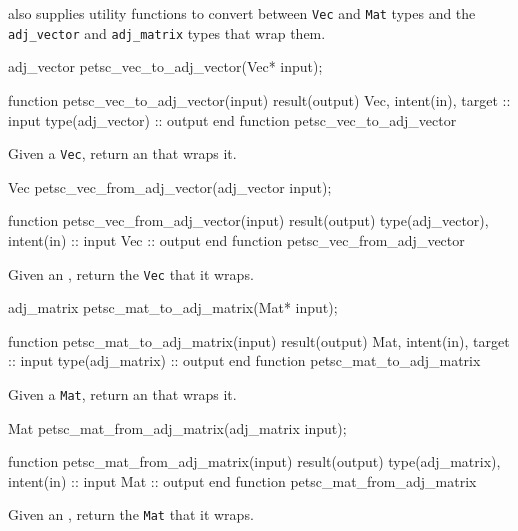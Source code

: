 \libadjoint also supplies utility functions to convert between \texttt{Vec} and \texttt{Mat}
types and the \texttt{adj_vector} and \texttt{adj_matrix} types that wrap them.
\begin{framed}
\begin{minipage}{\columnwidth}
\begin{ccode}
  adj_vector petsc_vec_to_adj_vector(Vec* input);
\end{ccode}
\begin{fortrancode}
  function petsc_vec_to_adj_vector(input) result(output)
    Vec, intent(in), target :: input
    type(adj_vector) :: output
  end function petsc_vec_to_adj_vector
\end{fortrancode}
\end{minipage}
\end{framed}
Given a \texttt{Vec}, return an  that wraps it.
\begin{framed}
\begin{minipage}{\columnwidth}
\begin{ccode}
  Vec petsc_vec_from_adj_vector(adj_vector input);
\end{ccode}
\begin{fortrancode}
  function petsc_vec_from_adj_vector(input) result(output)
    type(adj_vector), intent(in) :: input
    Vec :: output
  end function petsc_vec_from_adj_vector
\end{fortrancode}
\end{minipage}
\end{framed}
Given an , return the \texttt{Vec} that it wraps.
\begin{framed}
\begin{minipage}{\columnwidth}
\begin{ccode}
  adj_matrix petsc_mat_to_adj_matrix(Mat* input);
\end{ccode}
\begin{fortrancode}
  function petsc_mat_to_adj_matrix(input) result(output)
    Mat, intent(in), target :: input
    type(adj_matrix) :: output
  end function petsc_mat_to_adj_matrix
\end{fortrancode}
\end{minipage}
\end{framed}
Given a \texttt{Mat}, return an  that wraps it.
\begin{framed}
\begin{minipage}{\columnwidth}
\begin{ccode}
  Mat petsc_mat_from_adj_matrix(adj_matrix input);
\end{ccode}
\begin{fortrancode}
  function petsc_mat_from_adj_matrix(input) result(output)
    type(adj_matrix), intent(in) :: input
    Mat :: output
  end function petsc_mat_from_adj_matrix
\end{fortrancode}
\end{minipage}
\end{framed}
Given an , return the \texttt{Mat} that it wraps.
